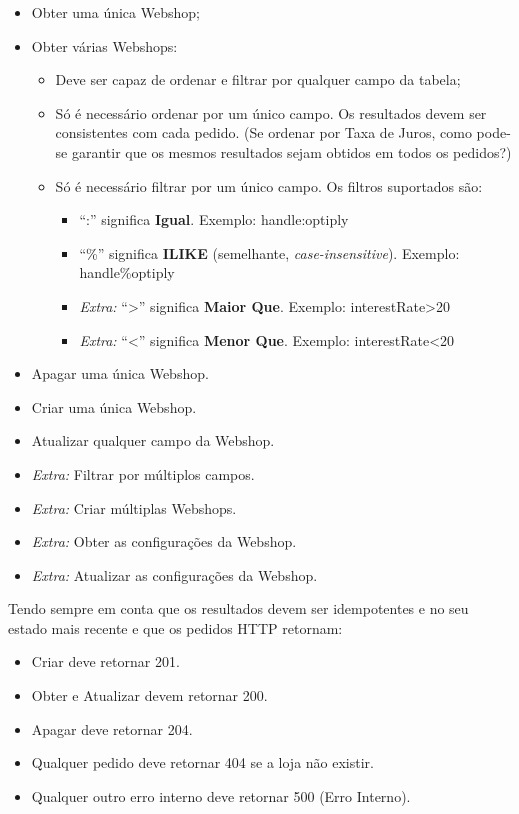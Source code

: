 \begin{itemize}
  \item Obter uma única Webshop;
  \item Obter várias Webshops:
        \begin{itemize}
          \item Deve ser capaz de ordenar e filtrar por qualquer campo da tabela;
          \item Só é necessário ordenar por um único campo. Os resultados devem ser consistentes com cada pedido. (Se ordenar por Taxa de Juros, como pode-se garantir que os mesmos resultados sejam obtidos em todos os pedidos?)
          \item Só é necessário filtrar por um único campo. Os filtros suportados são:
                \begin{itemize}
                  \item ``:'' significa \textbf{Igual}. Exemplo: handle:optiply 
                  \item ``\%'' significa \textbf{ILIKE} (semelhante, \textit{case-insensitive}). Exemplo: handle\%optiply
                  \item \textit{Extra:} ``>'' significa \textbf{Maior Que}. Exemplo: interestRate>20
                  \item \textit{Extra:} ``<'' significa \textbf{Menor Que}. Exemplo: interestRate<20
                \end{itemize}
        \end{itemize}
  \item Apagar uma única Webshop.
  \item Criar uma única Webshop.
  \item Atualizar qualquer campo da Webshop.
  \item \textit{Extra:} Filtrar por múltiplos campos.
  \item \textit{Extra:} Criar múltiplas Webshops.
  \item \textit{Extra:} Obter as configurações da Webshop.
  \item \textit{Extra:} Atualizar as configurações da Webshop.
\end{itemize}

Tendo sempre em conta que os resultados devem ser idempotentes e no seu estado mais recente e que os pedidos HTTP retornam:

\begin{itemize}
  \item Criar deve retornar 201.
  \item Obter e Atualizar devem retornar 200.
  \item Apagar deve retornar 204.
  \item Qualquer pedido deve retornar 404 se a loja não existir.
  \item Qualquer outro erro interno deve retornar 500 (Erro Interno).
\end{itemize}

